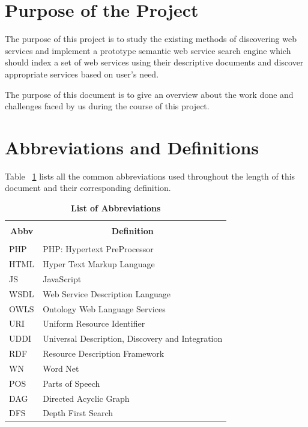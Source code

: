 \documentclass[12pt, oneside]{book}
\begin{document}
\section{Purpose of the Project}
The purpose of this project is to study the existing methods of discovering web services and implement a prototype semantic web service search engine which should index a set of web services using their descriptive documents and discover appropriate services based on user's need. \\ \par
The purpose of this document is to give an overview about the work done and challenges faced by us during the course of this project.

\section{Abbreviations and Definitions}
Table ~\ref{tab: abbv} lists all the common abbreviations used throughout the length of this document and their corresponding definition.
\begin{table}[h]
	\begin{center}
		\caption{\textbf{List of Abbreviations}}
		\label{tab: abbv}
		\begin{tabular}{| p{} | p{} |}
			\hline
			\multicolumn{1}{|c|}{} & \multicolumn{1}{c|}{} \\
			\multicolumn{1}{|c|}{\textbf{Abbv}} & \multicolumn{1}{c|}{\textbf{Definition}} \\
			\multicolumn{1}{|c|}{} & \multicolumn{1}{c|}{} \\
			\hline
			PHP & PHP: Hypertext PreProcessor \\ \hline
			HTML & Hyper Text Markup Language \\ \hline
			JS & JavaScript \\ \hline
			WSDL & Web Service Description Language \\ \hline
			OWLS & Ontology Web Language Services \\ \hline
			URI & Uniform Resource Identifier \\ \hline
			UDDI & Universal Description, Discovery and Integration \\ \hline
			RDF & Resource Description Framework \\ \hline
			WN & Word Net \\ \hline
			POS & Parts of Speech \\ \hline
			DAG & Directed Acyclic Graph \\ \hline
			DFS & Depth First Search \\ \hline
		\end{tabular}
	\end{center}
\end{table}
\end{document}

